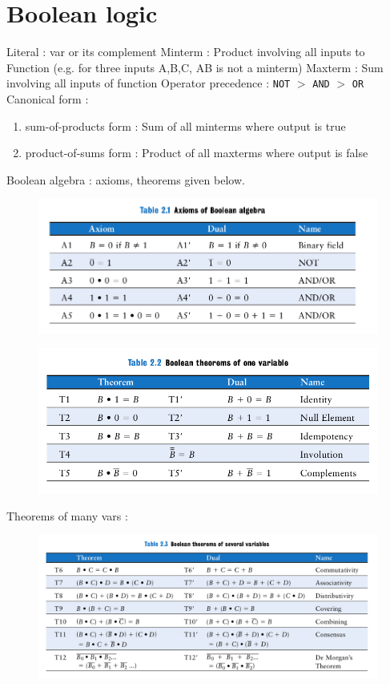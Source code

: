 \documentclass{article}[12pt]
\begin{document}
\section{Boolean logic}
Literal : var or its complement
Minterm : Product involving all inputs to Function (e.g. for three inputs A,B,C, AB is not a minterm)
Maxterm : Sum involving all inputs of function
Operator precedence : \verb|NOT| $>$ \verb|AND| $>$ \verb|OR|
Canonical form : 
\begin{enumerate}
  \item sum-of-products form : Sum of all minterms where output is true
  \item product-of-sums form : Product of all maxterms where output is false
\end{enumerate}
Boolean algebra : axioms, theorems given below.
\begin{figure}[htbp]
\centerline{\includegraphics[scale = 0.25]{../Images/a1.png}}
\end{figure}
\begin{figure}[htbp]
\centerline{\includegraphics[scale = 0.25]{../Images/a2.png}}
\end{figure}
Theorems of many vars : 
\begin{figure}[htbp]
\centerline{\includegraphics[scale = 0.25]{../Images/a3.png}}
\end{figure}
\end{document}
